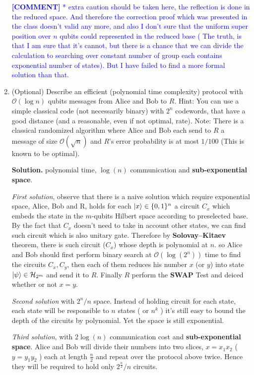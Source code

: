 \documentclass{article}
\newcommand{\commentt}[1]{\textcolor{blue}{ \textbf{[COMMENT]} #1}}
\newcommand{\ctt}[1]{\commentt{#1}}
\newcommand{\onotation}[1]{\(\mathcal{O} \left( {#1}  \right) \)}
\newcommand{\ona}[1]{\onotation{#1}}
\begin{document}
\begin{enumerate}
\ctt{* extra caution should be taken here, the reflection is done in the reduced space. And therefore the correction proof which was presented in the class doesn't valid any more, and also I don't sure that the uniform super position over \(n\) qubits could represented in the reduced base ( The truth, is that I am sure that it's cannot, but there is a chance that we can divide the calculation to searching over constant number of group each contains exponential number of states). But I have failed to find a more formal solution than that.   }


\item (Optional) Describe an efficient (polynomial time complexity) protocol with \ona{\log n} qubits messages from Alice and Bob to \(R\). Hint: You can use a simple classical code (not necessarily binary)
with \(2^n\) codewords, that have a good distance (and a reasonable, even if not optimal, rate). Note: There is a classical randomized algorithm where Alice and Bob each send to \(R\) a message of size \ona{\sqrt{n}}  and \(R\)’s error probability is at most \(1/100\) (This is known to be optimal).


\textbf{Solution.} polynomial time, \( \log(n) \) communication and \textbf{sub-exponential space}.  

\textit{First solution}, observe that there is a naive solution which require exponential space, Alice, Bob and R, holds for each \( \ket{x} \in \{0,1\}^n \) a circuit \( C_x \) which embeds the state in the \(m\)-qubits Hilbert space according to preselected base. By the fact that \(C_x\) doesn't need to take in account other states, we can find such circuit which is also unitary gate. Therefore by \textbf{Solovay–Kitaev} theorem, there is such circuit (\( C_x \)) whose depth is polynomial at \(n\). so Alice and Bob should first perform binary search at \ona{\log(2^n)} time to find the circuits \(C_x , C_y\), then each of them reduces his number \(x\) (or \( y \)) into state \( \ket{\psi} \in \mathcal{H}_{2^m} \) and send it to \(R\). Finally \(R\) perform the \textbf{SWAP} Test and deiced whether or not \(x = y\).

\textit{Second solution} with \( 2^n/n \) space. Instead of holding circuit for each state, each state will be responsible to \(n\) states ( or \( n^k \) ) it's still easy to bound the depth of the circuits by polynomial. Yet the space is still exponential.

\textit{Third solution}, with \( 2\log(n) \) communication cost and \textbf{sub-exponential space}. Alice and Bob will divide their numbers into two slices, \(x=x_1x_2\) ( \(y=y_1y_2\) ) each at length \( \frac{n}{2} \) and repeat over the protocol above twice. Hence they will be required to hold only \( 2^\frac{n}{2}/n \) circuits.




\end{enumerate}
\end{document}
